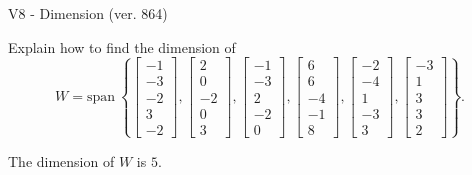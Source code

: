 \begin{exercise}
  \begin{exerciseTitle}V8 - Dimension (ver. 864)\end{exerciseTitle}
  \begin{exerciseStatement}
    Explain how to find the dimension of 
\[W=\mathrm{span}\ \left\{\left[\begin{array}{r}
-1 \\
-3 \\
-2 \\
3 \\
-2
\end{array}\right] , \left[\begin{array}{r}
2 \\
0 \\
-2 \\
0 \\
3
\end{array}\right] , \left[\begin{array}{r}
-1 \\
-3 \\
2 \\
-2 \\
0
\end{array}\right] , \left[\begin{array}{r}
6 \\
6 \\
-4 \\
-1 \\
8
\end{array}\right] , \left[\begin{array}{r}
-2 \\
-4 \\
1 \\
-3 \\
3
\end{array}\right] , \left[\begin{array}{r}
-3 \\
1 \\
3 \\
3 \\
2
\end{array}\right]\right\}.\]



  \end{exerciseStatement}
  \begin{exerciseAnswer}
   The dimension of \(W\) is  \(5\).
  


  \end{exerciseAnswer}
\end{exercise}
